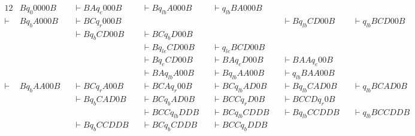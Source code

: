 \documentclass[docid=TP11]{tcom_TP}
\begin{document}
{\begin{center}
\end{center}
\begin{alignat*}{12}
	       & B q_0 0000B &&\vdash BA q_e 000B &&\vdash B q_{lb} A000B &&\vdash q_{lb} BA000B  && \\
	\vdash & B q_b A000B &&\vdash BC q_r 000B &&                      &&                      &&\vdash B q_{lb} CD00B &&\vdash q_{lb} BCD00B   && \\
		   &             &&\vdash B q_b CD00B &&\vdash BC q_b D00B    &&\\
		   &             &&                   &&\vdash B q_{le} CD00B &&\vdash q_{le} BCD00B  &&\\
		   &             &&                   &&\vdash B q_e CD00B    &&\vdash BA q_e D00B    &&\vdash BAA q_e 00B    &&\\
		   &             &&                   &&\vdash BA q_{lb} A 00B &&\vdash B q_{lb} AA00B &&\vdash q_{lb} BAA00B && \\
	\vdash & B q_b AA00B &&\vdash BC q_r A00B &&\vdash BCA q_r 00B    &&\vdash BC q_{lb} AD0B &&\vdash B q_{lb} CAD0B &&\vdash q_{lb} BCAD0B   &&\\  
		   &             &&\vdash B q_b CAD0B &&\vdash BC q_b AD0B    &&\vdash BCC q_r D0B    &&\vdash BCCD q_r 0B    &&\\
		   &             &&                   &&\vdash BCC q_{lb} DDB &&\vdash BC q_{lb} CDDB &&\vdash B q_{lb} CCDDB &&\vdash  q_{lb} BCCDDB &&\\
		   &             &&\vdash B q_b CCDDB &&\vdash BC q_b CDDB    &&\vdash BCC q_b DDB    &&\\

\end{alignat*}}
\end{document}

